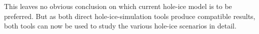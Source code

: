 This leaves no obvious conclusion on which current hole-ice model is to
be preferred. But as both direct hole-ice-simulation tools produce
compatible results, both tools can now be used to study the various
hole-ice scenarios in detail.

\begin{table}[p]
  \begin{center}
  \end{center}

\end{table}
